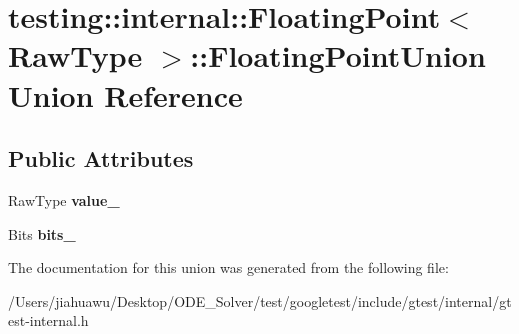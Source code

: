 \hypertarget{uniontesting_1_1internal_1_1_floating_point_1_1_floating_point_union}{}\section{testing\+:\+:internal\+:\+:Floating\+Point$<$ Raw\+Type $>$\+:\+:Floating\+Point\+Union Union Reference}
\label{uniontesting_1_1internal_1_1_floating_point_1_1_floating_point_union}
\subsection*{Public Attributes}
\begin{DoxyCompactItemize}
\item 
\mbox{\label{uniontesting_1_1internal_1_1_floating_point_1_1_floating_point_union_a4ee324889f70577721393e8e1920e4c6}} 
Raw\+Type {\bfseries value\+\_\+}
\item 
\mbox{\label{uniontesting_1_1internal_1_1_floating_point_1_1_floating_point_union_aedb69e386f5d624a016f7a781302a2bf}} 
Bits {\bfseries bits\+\_\+}
\end{DoxyCompactItemize}


The documentation for this union was generated from the following file\+:\begin{DoxyCompactItemize}
\item 
/\+Users/jiahuawu/\+Desktop/\+O\+D\+E\+\_\+\+Solver/test/googletest/include/gtest/internal/gtest-\/internal.\+h\end{DoxyCompactItemize}
